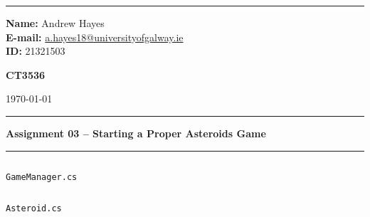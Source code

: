 \documentclass[a4paper, 11pt]{article}
\newenvironment{code}{\captionsetup{type=listing}}{}
\begin{document}
\hrule \medskip
\begin{minipage}{0.295\textwidth} 
    \raggedright
    \footnotesize 
    \textbf{Name:} Andrew Hayes \\
    \textbf{E-mail:} \href{mailto://a.hayes18@universityofgalway.ie}{a.hayes18@universityofgalway.ie}  \hfill\\   
    \textbf{ID:} 21321503 \hfill
\end{minipage}
\begin{minipage}{0.4\textwidth} 
    \centering 
    \vspace{0.4em}
    \Large 
    \textbf{CT3536} \\ 
\end{minipage}
\begin{minipage}{0.295\textwidth} 
    \raggedleft
    \today
\end{minipage}
\medskip\hrule 
\begin{center}
    \normalsize
    \textbf{Assignment 03 -- Starting a Proper Asteroids Game}
\end{center}
\hrule

\begin{code}
    \inputminted[texcl, mathescape, breaklines, frame=single, linenos]{csharp}{/home/andrew/code/Unity/Asteroids/Assets/GameManager.cs}
\caption{\texttt{GameManager.cs}}
\end{code}

\begin{code}
\inputminted[texcl, mathescape, breaklines, frame=single, linenos]{csharp}{/home/andrew/code/Unity/Asteroids/Assets/Resources/Asteroid.cs}
\caption{\texttt{Asteroid.cs}}
\end{code}
\end{document}
